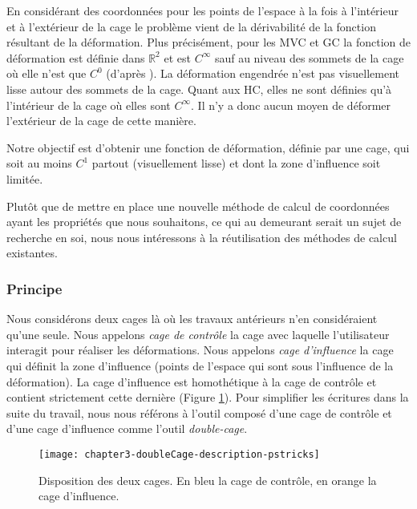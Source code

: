 En considérant des coordonnées pour les points de l'espace à la fois à
l'intérieur et à l'extérieur de la cage le problème vient de la dérivabilité
de la fonction résultant de la déformation. Plus précisément, pour les MVC et
GC la fonction de déformation est définie dans $\mathbb{R}^2$ et est
$C^{\infty}$ sauf au niveau des sommets de la cage où elle n'est que
$C^0$ (d'après \cite{LS08}). La déformation engendrée n'est pas visuellement lisse autour des
sommets de la cage. Quant aux HC, elles ne sont définies qu'à l'intérieur de
la cage où elles sont $C^{\infty}$. Il n'y a donc aucun moyen de déformer
l'extérieur de la cage de cette manière.

Notre objectif est d'obtenir une fonction de déformation, définie par une
cage, qui soit au moins $C^1$ partout (visuellement lisse) et dont la zone
d'influence soit limitée.

Plutôt que de mettre en place une nouvelle méthode de calcul de coordonnées
ayant les propriétés que nous souhaitons, ce qui au demeurant serait un sujet
de recherche en soi, nous nous intéressons à la réutilisation des méthodes de
calcul existantes.

\subsubsection{Principe}

Nous considérons deux cages là où les travaux antérieurs n'en considéraient
qu'une seule. Nous appelons \textit{cage de contrôle} la cage avec laquelle
l'utilisateur interagit pour réaliser les déformations. Nous appelons
\textit{cage d'influence} la cage qui définit la zone d'influence (points de
l'espace qui sont sous l'influence de la déformation). La cage d'influence est
homothétique à la cage de contrôle et contient strictement cette dernière
(Figure \ref{MELDou}). Pour simplifier les écritures dans la suite du travail,
nous nous référons à l'outil composé d'une cage de contrôle et d'une cage
d'influence comme l'outil \textit{double-cage}.

\begin{figure}[ht]
  \begin{center}
    \texttt{[image: chapter3-doubleCage-description-pstricks]}

    \caption[Disposition des cages de contrôle et d'influence] {Disposition
des deux cages. En bleu la cage de contrôle, en orange la cage d'influence.}

    \label{MELDou}
  \end{center}
\end{figure}

